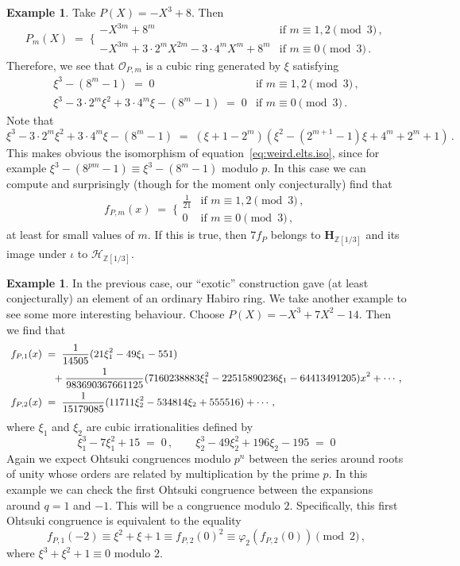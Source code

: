 \documentclass[12pt,reqno]{amsart}
\theoremstyle{definition}
\newtheorem{example}[proposition]{Example}
\def\BZ{\mathbb Z}
\def\calH{\mathcal H}
\def\HH{\mathbf H}
\def\be{\begin{equation}}
\def\ee{\end{equation}}
\def\={\;=\;}
\begin{document}
\begin{example}
Take $P(X)=-X^3+8$. Then
\be
P_{m}(X)
\=
\bigg\{
\begin{array}{cl}
-X^{3m}+8^m & \text{if }m\equiv 1,2\pmod{3}\,,\\
-X^{3m}+3\cdot2^mX^{2m}-3\cdot4^mX^{m}+8^m & \text{if }m\equiv 0\pmod{3}\,.
\end{array}
\ee
Therefore, we see that $\mathcal{O}_{P,m}$ is a cubic ring generated by $\xi$ satisfying
\be
\begin{array}{cl}
\xi^{3}-(8^m-1)\=0 & \text{if }m\equiv 1,2\pmod{3}\,,\\
\xi^{3}-3\cdot2^m\xi^{2}+3\cdot4^m\xi-(8^m-1)\=0 & \text{if }m\equiv 0\pmod{3}\,.
\end{array}
\ee
Note that
\be
\xi^{3}-3\cdot2^m\xi^{2}+3\cdot4^m\xi-(8^m-1)
\=
(\xi + 1-2^m)(\xi^2 - (2^{m+1} - 1)\xi + 4^{m} + 2^{m} + 1)\,.
\ee
This makes obvious the isomorphism of equation~\eqref{eq:weird.elts.iso}, since for
example $\xi^3-(8^{pm}-1)\equiv\xi^3-(8^{m}-1)$ modulo $p$. In this case we can
compute and surprisingly (though for the moment only conjecturally) find that
\be
f_{P,m}(x)
\=
\bigg\{
\begin{array}{cl}
\frac{1}{21} & \text{if }m\equiv 1,2\pmod{3}\,,\\
0 & \text{if }m\equiv 0\pmod{3}\,,
\end{array}
\ee
at least for small values of $m$.
If this is true, then $7f_{P}$ belongs to $\HH_{\BZ[1/3]}$ and its image under
$\iota$ to $\calH_{\BZ[1/3]}$.
\end{example}

\begin{example}
In the previous case, our ``exotic'' construction gave (at least conjecturally)
an element of an ordinary Habiro ring.
We take another example to see some more interesting behaviour. Choose
$P(X)=-X^3 + 7X^2 - 14$. Then we find that
\be
\begin{small}
\begin{aligned}
f_{P,1}(x)
&\=
\frac{1}{14505}(21\xi_1^2 - 49\xi_1 - 551)\\
&\quad+\frac{1}{983690367661125}(7160238883\xi_1^2 - 22515890236\xi_1
- 64413491205)x^2+\cdots\,,\\
f_{P,2}(x)
&\=
\frac{1}{15179085}(11711\xi_2^2 - 534814\xi_2 + 555516)+\cdots\,,
\end{aligned}
\end{small}
\ee
where $\xi_1$ and $\xi_2$ are cubic irrationalities defined by 
\be
\xi_1^3 - 7\xi_1^2 + 15\=0\,,\qquad
\xi_2^3 - 49\xi_2^2 + 196\xi_2 - 195\=0
\ee
Again we expect Ohtsuki congruences modulo $p^n$ between the series around roots
of unity whose orders are related by multiplication by the prime $p$. 
In this example we can check the first Ohtsuki congruence between the expansions
around $q=1$ and $-1$. This will be a congruence modulo $2$.
Specifically, this first Ohtsuki congruence is equivalent to the equality
\be
f_{P,1}(-2)
\equiv
\xi^2 + \xi + 1
\equiv
f_{P,2}(0)^{2}
\equiv
\varphi_2(f_{P,2}(0))\pmod{2}\,,
\ee
where $\xi^3 +\xi^2 + 1\equiv 0$ modulo $2$.
\end{example}
\end{document}
